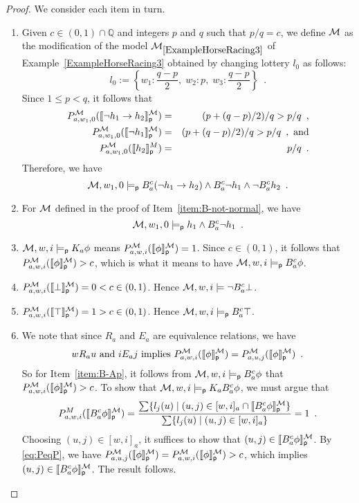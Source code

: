 \documentclass[12pt]{article}
\theoremstyle{definition}
\newcommand{\Rat}{\mathbb{Q}}  %
\newcommand{\M}{{\cal M}}      %
\newcommand{\modelsp}{\models_{\mathsf{p}}}                  %
\newcommand{\semp}[1]{\llbracket{#1}\rrbracket_{\mathsf{p}}} %
\begin{document}
\begin{proof}
  We consider each item in turn.
  \begin{enumerate}
  \item Given $c\in(0,1)\cap\Rat$ and integers $p$ and $q$ such that
    $p/q=c$, we define $\M$ as the modification of the model
    $\M_{\ref{ExampleHorseRacing3}}$ of
    Example~\ref{ExampleHorseRacing3} obtained by changing lottery
    $l_0$ as follows:
    \[
    l_0 := \left\{ w_1:\frac{q-p}2,\; w_2:p,\; w_3:\frac{q-p}2
    \right\}\enspace.
    \]
    Since $1\leq p<q$, it follows that
    \begin{eqnarray*}
      P^\M_{a,w_1,0}(\semp{\lnot h_1\to h_2}^\M) &=& 
      (p+(q-p)/2)/q > p/q \enspace,
      \\
      P^\M_{a,w_1,0}(\semp{\lnot h_1}^\M) &=& 
      (p+(q-p)/2)/q > p/q 
      \enspace,\text{ and}
      \\
      P^\M_{a,w_1,0}(\semp{h_2}^M)&=&p/q\enspace.
    \end{eqnarray*}
    Therefore, we have
    \[
    \M,w_1,0\modelsp B^c_a(\lnot h_1\to h_2)\land B^c_a\lnot h_1\land
    \lnot B^c_ah_2\enspace.
    \]
    
  \item For $\M$ defined in the proof of Item~\ref{item:B-not-normal},
    we have
    \[
    \M,w_1,0\modelsp h_1\land B_a^c\lnot h_1\enspace.
    \]
    
  \item $\M,w,i\modelsp K_a\phi$ means $P^\M_{a,w,i}(\semp{\phi}^\M)=1$.
    Since $c\in(0,1)$, it follows that
    $P^\M_{a,w,i}(\semp{\phi}^\M)>c$, which is what it means to have
    $\M,w,i\modelsp B_a^c\phi$.

  \item $P^\M_{a,w,i}(\semp{\bot}^\M)=0<c\in(0,1)$.  Hence
    $\M,w,i\models\lnot B^c_a\bot$.

  \item $P^\M_{a,w,i}(\semp{\top}^\M)=1>c\in(0,1)$. Hence
    $\M,w,i\modelsp B_a^c\top$.

  \item We note that since $R_a$ and $E_a$ are equivalence relations,
    we have
    \begin{equation}
      wR_au \text{ and } iE_aj \text{ implies } 
      P^\M_{a,w,i}(\semp{\phi}^\M)= P^\M_{a,u,j}(\semp{\phi}^\M)\enspace.
      \label{eq:PeqP}
    \end{equation}
    So for Item~\ref{item:B-Ap}, it follows from $\M,w,i\modelsp
    B_a^c\phi$ that $P^\M_{a,w,i}(\semp{\phi}^\M)>c$.  To show that
    $\M,w,i\modelsp K_aB_a^c\phi$, we must argue that
    \[
    P^M_{a,w,i}(\semp{B_a^c\phi}^\M)= \frac{\sum\{l_j(u) \mid
      (u,j)\in[w,i]_a\cap \semp{B_a^c\phi}^\M\}} {\sum\{l_j(u) \mid
      (u,j)\in[w,i]_a\}} = 1\enspace.
    \]
    Choosing $(u,j)\in[w,i]_a$, it suffices to show that
    $(u,j)\in\semp{B_a^c\phi}^\M$.  By \eqref{eq:PeqP}, we have
    $P^\M_{a,u,j}(\semp{\phi}^\M)=P^\M_{a,w,i}(\semp{\phi}^\M)>c$, which
    implies $(u,j)\in\semp{B_a^c\phi}^\M$.  The result follows.
    

\end{enumerate}
\end{proof}
\end{document}
